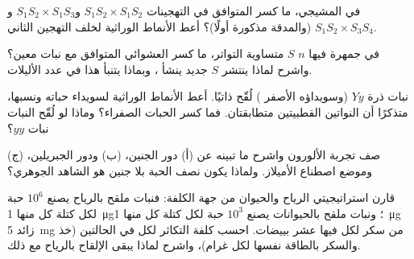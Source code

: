 \begin{exercise}[$\star\star$]\label{exo:b2:angiosperm-reproduction:6}
في  المشيجي، ما كسر  المتوافق في التهجينات
$S_1S_2\times S_1S_2$ و$S_1S_2\times
S_1S_3$ و$S_1S_2\times S_3S_4$ (والمدقة مذكورة أولًا)؟ أعط
الأنماط الوراثية لخلف التهجين الثاني.
\end{exercise}

\begin{exercise}[$\star\star$]\label{exo:b2:angiosperm-reproduction:7}
في جمهرة فيها $n$  $S$ متساوية التواتر، ما كسر  العشوائي
المتوافق مع نبات معين؟ واشرح لماذا ينتشر  $S$ جديد ينشأ
، وبماذا يتنبأ هذا في عدد الأليلات.
\end{exercise}

\begin{exercise}[$\star\star$]\label{exo:b2:angiosperm-reproduction:8}
نبات ذرة  $Yy$ (وسويداؤه الأصفر ) لُقّح ذاتيًا.
أعط الأنماط الوراثية لسويداء حباته ونسبها، متذكرًا أن النواتين
القطبيتين متطابقتان. فما كسر الحبات الصفراء؟ وماذا لو لُقّح النبات
 نبات $yy$؟
\end{exercise}

\begin{exercise}[$\star\star$]\label{exo:b2:angiosperm-reproduction:9}
صف تجربة الألورون واشرح ما تبينه عن (أ) دور الجنين، (ب) ودور
الجبريلين، (ج) وموضع اصطناع الأميلاز. ولماذا يكون نصف الحبة بلا
جنين هو الشاهد الجوهري؟
\end{exercise}

\begin{exercise}[$\star\star\star$]\label{exo:b2:angiosperm-reproduction:10}
قارن استراتيجيتي الرياح والحيوان من جهة الكلفة: فنبات ملقح بالرياح
يصنع $10^{6}$ حبة لكل  كتلة كل منها \qty{1}{\micro g}؛ ونبات
ملقح بالحيوانات يصنع $10^{3}$ حبة لكل  كتلة كل منها
\qty{1}{\micro g} زائد \qty{5}{mg} من سكر  لكل 
فيها عشر بييضات. احسب كلفة التكاثر لكل  في الحالتين
(خذ  والسكر بالطاقة نفسها لكل غرام)، واشرح لماذا يبقى
الإلقاح بالرياح مع ذلك.
\end{exercise}

